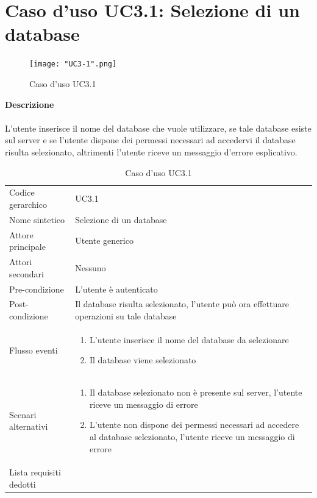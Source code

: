 \documentclass[a4paper]{report}
\begin{document}
	 \section{Caso d'uso UC3.1: Selezione di un database}
	 	\begin{figure}[H]
			\centering
			\texttt{[image: "UC3-1".png]}
			\caption{Caso d'uso UC3.1}
		\end{figure}
	 \textbf{Descrizione} \\ \\
	 L'utente inserisce il nome del database che vuole utilizzare, se tale database esiste sul server e se 
	 l'utente dispone dei permessi necessari ad accedervi il database risulta selezionato, altrimenti l'utente
	 riceve un messaggio d'errore esplicativo.
		\begin{table}[H]
		\begin{tabularx}{\textwidth}{X | X}\toprule
			\rowcolor{orange!65}Codice gerarchico & UC3.1 \\
			Nome sintetico & Selezione di un database \\
			\rowcolor{orange!65}Attore principale & Utente generico\\
			Attori secondari & Nessuno \\
			\rowcolor{orange!65}Pre-condizione & L'utente è autenticato\\
			Post-condizione & Il database risulta selezionato, l'utente può ora effettuare operazioni su tale
			database \\
			\rowcolor{orange!65}Flusso eventi & \begin{enumerate}
			\item L'utente inserisce il nome del database da selezionare
			\item Il database viene selezionato
			\end{enumerate} \\
			Scenari alternativi &  \begin{enumerate}
			\item Il database selezionato non è presente sul server, l'utente riceve un messaggio di errore
			\item L'utente non dispone dei permessi necessari ad accedere al database selezionato, l'utente
			riceve un messaggio di errore
			\end{enumerate}			 \\
			\rowcolor{orange!65}Lista requisiti dedotti & \\
			\bottomrule
		\end{tabularx}
		\caption{Caso d'uso UC3.1}
	 \end{table}
\end{document}
